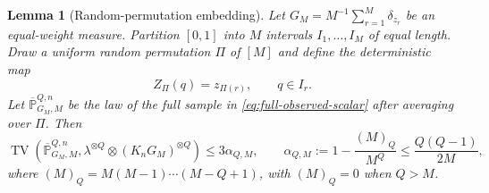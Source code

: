 \documentclass[11pt]{article}
\newtheorem{lemma}[theorem]{Lemma}
\newcommand{\TV}{\operatorname{TV}}
\begin{document}
\begin{lemma}[Random-permutation embedding]
\label{lem:permutation-embedding}
Let $G_M=M^{-1}\sum_{r=1}^M\delta_{z_r}$ be an equal-weight measure.  Partition $[0,1]$ into $M$ intervals $I_1,\dots,I_M$ of equal length.  Draw a uniform random permutation $\Pi$ of $[M]$ and define the deterministic map
\[
Z_\Pi(q)=z_{\Pi(r)},
\qquad q\in I_r.
\]
Let $\overline{\mathbb P}^{Q,n}_{G_M,M}$ be the law of the full sample in \eqref{eq:full-observed-scalar} after averaging over $\Pi$.  Then
\begin{equation}
\label{eq:permutation-TV}
\TV\!\left(
\overline{\mathbb P}^{Q,n}_{G_M,M},
\lambda^{\otimes Q}\otimes(K_nG_M)^{\otimes Q}
\right)
\le
3\alpha_{Q,M},
\qquad
\alpha_{Q,M}
:=
1-\frac{(M)_Q}{M^Q}
\le
\frac{Q(Q-1)}{2M},
\end{equation}
where $(M)_Q=M(M-1)\cdots(M-Q+1)$, with $(M)_Q=0$ when $Q>M$.
\end{lemma}
\end{document}
